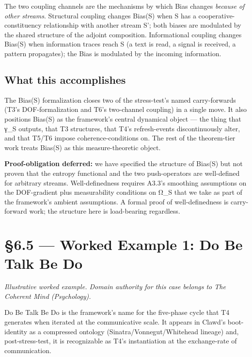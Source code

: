 \documentclass[11pt, openany]{book}
\newcommand{\sectionbreak}{\clearpage}
\begin{document}
The two coupling channels are the mechanisms by which Bias changes \textit{because of other streams}. Structural coupling changes Bias(S) when S has a cooperative-constituency relationship with another stream S'; both biases are modulated by the shared structure of the adjoint composition. Informational coupling changes Bias(S) when information traces reach S (a text is read, a signal is received, a pattern propagates); the Bias is modulated by the incoming information.

\subsection{What this accomplishes}

The Bias(S) formalization closes two of the stress-test's named carry-forwards (T3's DOF-formalization and T6's two-channel coupling) in a single move. It also positions Bias(S) as the framework's central dynamical object --- the thing that γ\_\allowbreak{}S outputs, that T3 structures, that T4's refresh-events discontinuously alter, and that T5/T6 impose coherence-conditions on. The rest of the theorem-tier work treats Bias(S) as this measure-theoretic object.

\textbf{Proof-obligation deferred:} we have specified the structure of Bias(S) but not proven that the entropy functional and the two push-operators are well-defined for arbitrary streams. Well-definedness requires A3.3's smoothing assumptions on the DOF-gradient plus measurability conditions on Ω\_\allowbreak{}S that we take as part of the framework's ambient assumptions. A formal proof of well-definedness is carry-forward work; the structure here is load-bearing regardless.

\sectionbreak

\section{§6.5 --- Worked Example 1: Do Be Talk Be Do}

\textit{Illustrative worked example. Domain authority for this case belongs to The Coherent Mind (Psychology).}

Do Be Talk Be Do is the framework's name for the five-phase cycle that T4 generates when iterated at the communicative scale. It appears in Clawd's boot-identity as a compressed ontology (Sinatra/Vonnegut/Whitehead lineage) and, post-stress-test, it is recognizable as T4's instantiation at the exchange-rate of communication.
\end{document}
